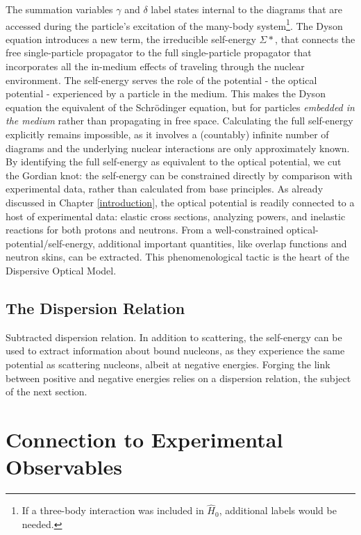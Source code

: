The summation variables $\gamma$ and $\delta$ label states internal to the diagrams that are 
accessed during the particle's excitation of the many-body system\footnote{If a three-body 
    interaction was included in $\hat{H}_{0}$, additional labels would be needed.}. The Dyson
    equation introduces a new term, the irreducible self-energy $\Sigma*$, that connects the free
    single-particle propagator to the full single-particle propagator that incorporates all the
    in-medium effects of traveling through the nuclear environment. The self-energy serves the role
    of the potential - the optical potential - experienced by a particle in the medium.
    This makes the Dyson equation the
    equivalent of the Schr\"odinger equation, but for particles \textit{embedded in the medium} 
    rather than propagating in free space. Calculating the full self-energy explicitly remains
    impossible, as it involves a (countably) infinite number of diagrams and the underlying nuclear
    interactions are only approximately known. By identifying the full self-energy as equivalent
    to the optical potential, we cut the Gordian knot: the self-energy can be constrained
    directly by comparison with experimental data, rather than calculated from base
    principles. As already discussed in Chapter \ref{introduction}, the optical potential is  
    readily connected to a host of experimental data: elastic cross sections, analyzing powers, and 
    inelastic reactions for both protons and neutrons.
    From a well-constrained optical-potential/self-energy, additional important quantities, like
    overlap functions and neutron skins, can be extracted. This phenomenological tactic is the 
    heart of the Dispersive Optical Model.
    
    \subsection{The Dispersion Relation}
    Subtracted dispersion relation.
    In addition to scattering, the self-energy can be used to extract information
    about bound nucleons, as they experience the same potential as scattering nucleons, albeit at
    negative energies. Forging the link between positive and negative energies relies on a
    dispersion relation, the subject of the next section.

\section{Connection to Experimental Observables}

